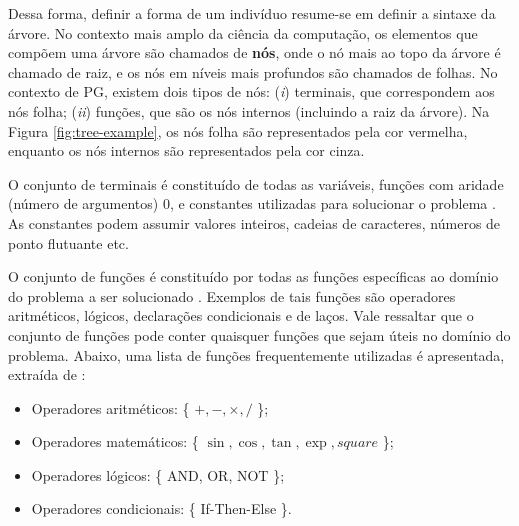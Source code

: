 Dessa forma, definir a forma de um indivíduo resume-se em definir a sintaxe da árvore. No contexto mais amplo da ciência da computação, os elementos que compõem uma árvore são chamados de \textbf{nós}, onde o nó mais ao topo da árvore é chamado de raiz, e os nós em níveis mais profundos são chamados de folhas. No contexto de PG, existem dois tipos de nós: (\textit{i}) terminais, que correspondem aos nós folha; (\textit{ii}) funções, que são os nós internos (incluindo a raiz da árvore). Na Figura \ref{fig:tree-example}, os nós folha são representados pela cor vermelha, enquanto os nós internos são representados pela cor cinza.

O conjunto de terminais é constituído de todas as variáveis, funções com aridade (número de argumentos) 0, e constantes utilizadas para solucionar o problema \cite{poli2008,banzhaf1998}. As constantes podem assumir valores inteiros, cadeias de caracteres, números de ponto flutuante etc.

O conjunto de funções é constituído por todas as funções específicas ao domínio do problema a ser solucionado \cite{poli2008}. Exemplos de tais funções são operadores aritméticos, lógicos, declarações condicionais e de laços. Vale ressaltar que o conjunto de funções pode conter quaisquer funções que sejam úteis no domínio do problema. Abaixo, uma lista de funções frequentemente utilizadas é apresentada, extraída de \cite{poli2008,banzhaf1998}:

\begin{itemize}
    \item Operadores aritméticos: \{ $+, -, \times, /$ \};
    \item Operadores matemáticos: \{ $\sin, \cos, \tan, \exp, square$ \};
    \item Operadores lógicos: \{ AND, OR, NOT \};
    \item Operadores condicionais: \{ If-Then-Else \}.
\end{itemize}


